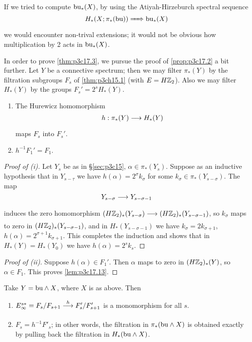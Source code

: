 \documentclass[../main]{subfiles}
\begin{document}
\begin{remark*}
If we tried to compute $\mathrm{bu}_\ast(X)$, by using the Atiyah-Hirzeburch spectral sequence \[H_\ast(X; \pi_\ast(\mathrm{bu})) \xRightarrow{\phantom{.....}} \mathrm{bu}_\ast(X)\] we would encounter non-trival extensions; it would not be obvious how multiplication by 2 acts in $\mathrm{bu}_\ast(X)$. 
\end{remark*} 

In order to prove \ref{thm:p3c17.3}, we pursue the proof of \ref{prop:p3c17.2} a bit further. Let $Y$ be a connective spectrum; then we may filter $\pi_\ast(Y)$ by the filtration subgroups $F_s$ of \ref{thm:p3ch15.1} (with $E = H \mathbb{Z}_2$). Also we may filter $H_\ast(Y)$ by the groups $F_s' = 2^s H_\ast(Y)$.

\begin{lemma}
\label{lem:p3c17.13}
\begin{enumerate}
    \item[(i)] The Hurewicz homomorphism \[h : \pi_\ast(Y) \lar{} H_\ast(Y)\] maps $F_s$ into $F_s'$.
    \item[(ii)] $h^{-1} F_1' = F_1$.
\end{enumerate}
\end{lemma}

\begin{proof}[Proof of (i)]
Let $Y_s$ be as in \S\ref{sec:p3c15}, $\alpha \in \pi_\ast(Y_s)$. Suppose as an inductive hypothesis that in $Y_{s - \tau}$ we have $h(\alpha) = 2^\sigma k_\sigma$ for some $k_\sigma \in \pi_\ast(Y_{s - \sigma})$. The map \[Y_{s - \sigma} \lar{} Y_{s - \sigma - 1}\] induces the zero homomorphism $(H \bbZ_2)_\ast(Y_{s - \sigma}) \lar{} (H \bbZ_2)_\ast(Y_{s - \sigma - 1})$, so $k_\sigma$ maps to zero in $(H \mathbb{Z}_2)_\ast(Y_{s - \sigma - 1})$, and in $H_\ast(Y_{s - \sigma - 1})$ we have $k_\sigma = 2 k_{\sigma + 1}$, $h(\alpha) = 2^{\sigma + 1} k_{\sigma + 1}$. This completes the induction and shows that in $H_\ast(Y) = H_\ast(Y_0)$ we have $h(\alpha) = 2^sk_s$.
\end{proof}

\begin{proof}[Proof of (ii)]
Suppose $h(\alpha) \in F_1'$. Then $\alpha$ maps to zero in $(H\mathbb{Z}_2)_\ast(Y)$, so $\alpha \in F_1$. This proves \ref{lem:p3c17.13}. 
\end{proof}

\begin{lemma}
\label{lem:p3c17.14}
Take $Y = \mathrm{bu} \wedge X$, where $X$ is as above. Then 

\begin{enumerate}
    \item[(i)] $E_\infty^{s\ast} = F_s/F_{s + 1} \lar{h} F_s'/F'_{s + 1}$ is a monomorphism for all $s$.
    \item[(ii)] $F_s = h^{-1} F'_s$; in other words, the filtration in $\pi_\ast(\mathrm{bu} \wedge X)$ is obtained exactly by pulling back the filtration in $H_\ast(\mathrm{bu} \wedge X)$.
\end{enumerate}
\end{lemma}
\end{document}
